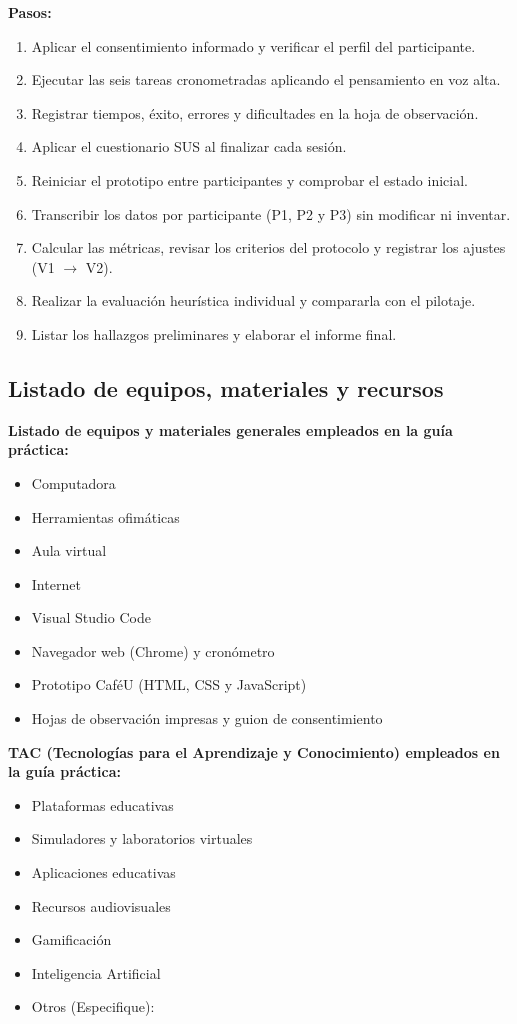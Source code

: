 \documentclass{article}
\begin{document}
\textbf{Pasos:}
\begin{enumerate}[leftmargin=1.5em, itemsep=2pt]
    \item Aplicar el consentimiento informado y verificar el perfil del participante.
    \item Ejecutar las seis tareas cronometradas aplicando el pensamiento en voz alta.
    \item Registrar tiempos, éxito, errores y dificultades en la hoja de observación.
    \item Aplicar el cuestionario SUS al finalizar cada sesión.
    \item Reiniciar el prototipo entre participantes y comprobar el estado inicial.
    \item Transcribir los datos por participante (P1, P2 y P3) sin modificar ni inventar.
    \item Calcular las métricas, revisar los criterios del protocolo y registrar los ajustes (V1 $\rightarrow$ V2).
    \item Realizar la evaluación heurística individual y compararla con el pilotaje.
    \item Listar los hallazgos preliminares y elaborar el informe final.
\end{enumerate}

\subsection{Listado de equipos, materiales y recursos}
\textbf{Listado de equipos y materiales generales empleados en la guía práctica:}
\begin{itemize}[leftmargin=1.5em, itemsep=3pt]
    \item Computadora
    \item Herramientas ofimáticas
    \item Aula virtual
    \item Internet
    \item Visual Studio Code
    \item Navegador web (Chrome) y cronómetro
    \item Prototipo CaféU (HTML, CSS y JavaScript)
    \item Hojas de observación impresas y guion de consentimiento
\end{itemize}

\textbf{TAC (Tecnologías para el Aprendizaje y Conocimiento) empleados en la guía práctica:}
\begin{itemize}[leftmargin=1.5em, itemsep=2pt]
    \item[$\square$] Plataformas educativas
    \item[$\square$] Simuladores y laboratorios virtuales
    \item[$\square$] Aplicaciones educativas
    \item[$\square$] Recursos audiovisuales
    \item[$\square$] Gamificación
    \item[$\blacksquare$] Inteligencia Artificial
    \item Otros (Especifique): \underline{\hspace{5cm}}
\end{itemize}
\end{document}
